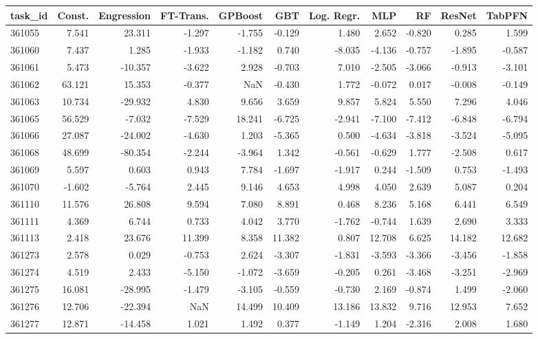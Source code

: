 \begin{tabular}{lrrrrrrrrrr}
\toprule
task\_id & Const. & Engression & FT-Trans. & GPBoost & GBT & Log. Regr. & MLP & RF & ResNet & TabPFN \\
\midrule
361055 & 7.541 & 23.311 & -1.297 & -1.755 & -0.129 & 1.480 & 2.652 & -0.820 & 0.285 & 1.599 \\
361060 & 7.437 & 1.285 & -1.933 & -1.182 & 0.740 & -8.035 & -4.136 & -0.757 & -1.895 & -0.587 \\
361061 & 5.473 & -10.357 & -3.622 & 2.928 & -0.703 & 7.010 & -2.505 & -3.066 & -0.913 & -3.101 \\
361062 & 63.121 & 15.353 & -0.377 & NaN & -0.430 & 1.772 & -0.072 & 0.017 & -0.008 & -0.149 \\
361063 & 10.734 & -29.932 & 4.830 & 9.656 & 3.659 & 9.857 & 5.824 & 5.550 & 7.296 & 4.046 \\
361065 & 56.529 & -7.032 & -7.529 & 18.241 & -6.725 & -2.941 & -7.100 & -7.412 & -6.848 & -6.794 \\
361066 & 27.087 & -24.002 & -4.630 & 1.203 & -5.365 & 0.500 & -4.634 & -3.818 & -3.524 & -5.095 \\
361068 & 48.699 & -80.354 & -2.244 & -3.964 & 1.342 & -0.561 & -0.629 & 1.777 & -2.508 & 0.617 \\
361069 & 5.597 & 0.603 & 0.943 & 7.784 & -1.697 & -1.917 & 0.244 & -1.509 & 0.753 & -1.493 \\
361070 & -1.602 & -5.764 & 2.445 & 9.146 & 4.653 & 4.998 & 4.050 & 2.639 & 5.087 & 0.204 \\
361110 & 11.576 & 26.808 & 9.594 & 7.080 & 8.891 & 0.468 & 8.236 & 5.168 & 6.441 & 6.549 \\
361111 & 4.369 & 6.744 & 0.733 & 4.042 & 3.770 & -1.762 & -0.744 & 1.639 & 2.690 & 3.333 \\
361113 & 2.418 & 23.676 & 11.399 & 8.358 & 11.382 & 0.807 & 12.708 & 6.625 & 14.182 & 12.682 \\
361273 & 2.578 & 0.029 & -0.753 & 2.624 & -3.307 & -1.831 & -3.593 & -3.366 & -3.456 & -1.858 \\
361274 & 4.519 & 2.433 & -5.150 & -1.072 & -3.659 & -0.205 & 0.261 & -3.468 & -3.251 & -2.969 \\
361275 & 16.081 & -28.995 & -1.479 & -3.105 & -0.559 & -0.730 & 2.169 & -0.874 & 1.499 & -2.060 \\
361276 & 12.706 & -22.394 & NaN & 14.499 & 10.409 & 13.186 & 13.832 & 9.716 & 12.953 & 7.652 \\
361277 & 12.871 & -14.458 & 1.021 & 1.492 & 0.377 & -1.149 & 1.204 & -2.316 & 2.008 & 1.680 \\

\end{tabular}
